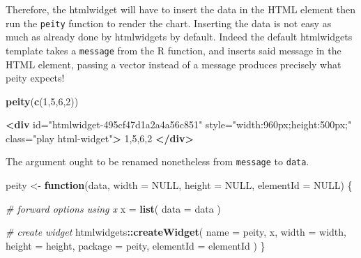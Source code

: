 \documentclass[
]{krantz}
\makeatletter
\newenvironment{Shaded}{\begin{snugshade}}{\end{snugshade}}
\newcommand{\CommentTok}[1]{\textcolor[rgb]{0.37,0.37,0.37}{\textit{#1}}}
\newcommand{\ControlFlowTok}[1]{\textcolor[rgb]{0.27,0.27,0.27}{\textbf{#1}}}
\newcommand{\DataTypeTok}[1]{\textcolor[rgb]{0.27,0.27,0.27}{#1}}
\newcommand{\DecValTok}[1]{\textcolor[rgb]{0.06,0.06,0.06}{#1}}
\newcommand{\KeywordTok}[1]{\textcolor[rgb]{0.27,0.27,0.27}{\textbf{#1}}}
\newcommand{\NormalTok}[1]{#1}
\newcommand{\OperatorTok}[1]{\textcolor[rgb]{0.43,0.43,0.43}{\textbf{#1}}}
\newcommand{\OtherTok}[1]{\textcolor[rgb]{0.37,0.37,0.37}{#1}}
\newcommand{\StringTok}[1]{\textcolor[rgb]{0.5,0.5,0.5}{#1}}
\newenvironment{kframe}{%
\medskip{}
\setlength{\fboxsep}{.8em}
 \def\at@end@of@kframe{}%
 \ifinner\ifhmode%
  \def\at@end@of@kframe{\end{minipage}}%
  \begin{minipage}{\columnwidth}%
 \fi\fi%
 \def\FrameCommand##1{\hskip\@totalleftmargin \hskip-\fboxsep
 \colorbox{shadecolor}{##1}\hskip-\fboxsep
     \hskip-\linewidth \hskip-\@totalleftmargin \hskip\columnwidth}%
 \MakeFramed {\advance\hsize-\width
   \@totalleftmargin\z@ \linewidth\hsize
   \@setminipage}}%
 {\par\unskip\endMakeFramed%
 \at@end@of@kframe}
\renewenvironment{Shaded}{\begin{kframe}}{\end{kframe}}
\makeatother
\begin{document}
Therefore, the htmlwidget will have to insert the data in the HTML element then run the \texttt{peity} function to render the chart. Inserting the data is not easy as much as already done by htmlwidgets by default. Indeed the default htmlwidgets template takes a \texttt{message} from the R function, and inserts said message in the HTML element, passing a vector instead of a message produces precisely what peity expects!

\begin{Shaded}
\begin{Highlighting}[]
\KeywordTok{peity}\NormalTok{(}\KeywordTok{c}\NormalTok{(}\DecValTok{1}\NormalTok{,}\DecValTok{5}\NormalTok{,}\DecValTok{6}\NormalTok{,}\DecValTok{2}\NormalTok{))}
\end{Highlighting}
\end{Shaded}

\begin{Shaded}
\begin{Highlighting}[]
\KeywordTok{<div} 
\OtherTok{  id=}\StringTok{"htmlwidget{-}495cf47d1a2a4a56c851"} 
\OtherTok{  style=}\StringTok{"width:960px;height:500px;"} 
\OtherTok{  class=}\StringTok{"play html{-}widget"}\KeywordTok{>}
\NormalTok{  1,5,6,2}
\KeywordTok{</div>}
\end{Highlighting}
\end{Shaded}

The argument ought to be renamed nonetheless from \texttt{message} to \texttt{data}.

\begin{Shaded}
\begin{Highlighting}[]
\NormalTok{peity <{-}}\StringTok{ }\ControlFlowTok{function}\NormalTok{(data, }\DataTypeTok{width =} \OtherTok{NULL}\NormalTok{, }\DataTypeTok{height =} \OtherTok{NULL}\NormalTok{, }
  \DataTypeTok{elementId =} \OtherTok{NULL}\NormalTok{) \{}

  \CommentTok{\# forward options using x}
\NormalTok{  x =}\StringTok{ }\KeywordTok{list}\NormalTok{(}
    \DataTypeTok{data =}\NormalTok{ data}
\NormalTok{  )}

  \CommentTok{\# create widget}
\NormalTok{  htmlwidgets}\OperatorTok{::}\KeywordTok{createWidget}\NormalTok{(}
    \DataTypeTok{name =} \StringTok{\textquotesingle{}peity\textquotesingle{}}\NormalTok{,}
\NormalTok{    x,}
    \DataTypeTok{width =}\NormalTok{ width,}
    \DataTypeTok{height =}\NormalTok{ height,}
    \DataTypeTok{package =} \StringTok{\textquotesingle{}peity\textquotesingle{}}\NormalTok{,}
    \DataTypeTok{elementId =}\NormalTok{ elementId}
\NormalTok{  )}
\NormalTok{\}}
\end{Highlighting}
\end{Shaded}
\end{document}
